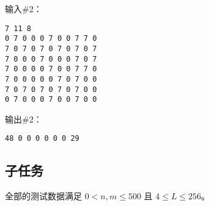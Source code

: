 输入\#2：

\begin{lstlisting}
7 11 8
0 7 0 0 0 7 0 0 7 7 0
7 0 7 0 7 0 7 0 7 0 7
7 0 0 0 7 0 0 0 7 0 7
7 0 0 0 0 7 0 0 7 7 0
7 0 0 0 0 0 7 0 7 0 0
7 0 7 0 7 0 7 0 7 0 0
0 7 0 0 0 7 0 0 7 0 0
\end{lstlisting}

输出\#2：

\begin{lstlisting}
48 0 0 0 0 0 0 29
\end{lstlisting}

\subsection*{子任务}

全部的测试数据满足 $0 < n, m \le 500$ 且 $4 \le L \le 256$。


